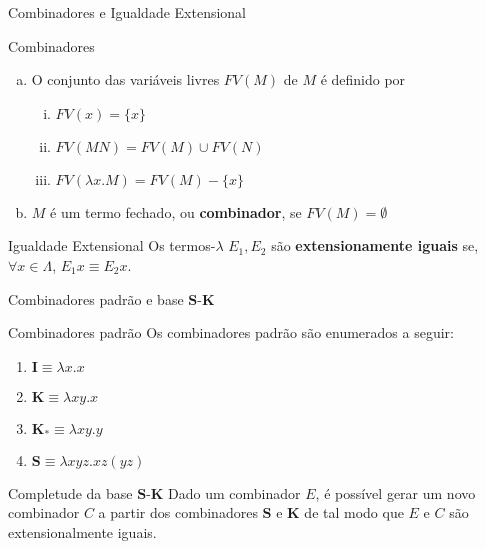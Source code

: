 \begin{frame}[fragile]{Combinadores e Igualdade Extensional}

    \begin{block}{Combinadores}
        \begin{enumerate}[(a)]
            \item O conjunto das variáveis livres $FV(M)$ de $M$ é definido por
            \begin{enumerate}[i.]
                \item $FV(x) = \lbrace x\rbrace$
                \item $FV(MN) = FV(M)\cup FV(N)$
                \item $FV(\lambda x.M) = FV(M) - \lbrace x\rbrace$
            \end{enumerate}

            \item $M$ é um termo fechado, ou \textbf{combinador}, se $FV(M) = \emptyset$
        \end{enumerate}
    \end{block}

    \vspace{0.1in}

    \begin{block}{Igualdade Extensional}
        Os termos-$\lambda$ $E_1, E_2$ são \textbf{extensionamente iguais} se, 
        $\forall x\in\Lambda$, $E_1x \equiv E_2x$.
    \end{block}

\end{frame}

\begin{frame}[fragile]{Combinadores padrão e base $\mathbf{S}$-$\mathbf{K}$}

    \begin{block}{Combinadores padrão}
        Os combinadores padrão são enumerados a seguir: 
        \begin{enumerate}
            \item $\mathbf{I} \equiv \lambda x.x$ 
            \item $\mathbf{K} \equiv \lambda xy.x$ 
            \item $\mathbf{K_*} \equiv \lambda xy.y$ 
            \item $\mathbf{S} \equiv \lambda xyz.xz(yz)$
        \end{enumerate}
    \end{block}

    \vspace{0.1in}

    \begin{block}{Completude da base $\mathbf{S}$-$\mathbf{K}$}
        Dado um combinador $E$, é possível gerar um novo combinador $C$ a partir dos
        combinadores $\mathbf{S}$ e $\mathbf{K}$ de tal modo que $E$ e $C$ são
        extensionalmente iguais.
    \end{block}

\end{frame}

